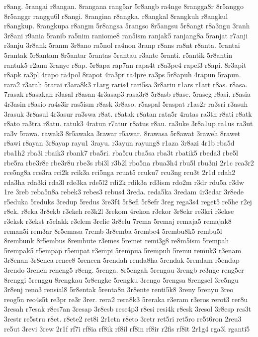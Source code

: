 {r8ang. 5rangai r8angan. 8rangana rang5ar 5r8angb ra4nge 8rangga8r 8r5anggo
8r5anggr ranggu6l r8angi. 8rangina r8angka. r8angkal 8rangkuh r8angkul
r8angkup. 8rangkupa r8angm 5r8angsa 5rangso 8r5angsu 5r8angt r8a3ngu 3ranh
3r8ani r9ania 5ranib ra5nim raniome8 ran5ism ranjak5 ranjang8a 5ranjat
r7anji r3anju 3r8ank 5ranm 3r8ano ra5nol ra4non 3ranp r8ans ra8nt r8anta.
5rantai 5rantak 5r8antam 8r5antar 5rantas 5rantau r3ante 5ranti. r5antik
5r8antin rantuk5 r2anu 3ranye r8ap. 5r8apa rap7an rapa4t r8a3pe4 rapel3
r8api. 8r3apit r8apk ra3pl 4rapo ra4pol 8rapot 4ra3pr ra4pre ra3ps 5r8apuh
4rapun 5rapun. rara2 r3arah 5rarai r3ara8k3 r1arg raris4 rari5sa 3r8ariu
r1ars r1art r8as. r8asa. 7rasak r8asakan r3asal r8asan 4r3asap3 rasa3r8
5r8asb r8ase. 5raseg r8asi. r8asia 4r3asin r8asio ra4s3ir ras5ism r8ask
3r8aso. r5aspal 5raspat r1as2r ra3sri r3asuh 3rasuk 3r8asul 4r3asur ra3swa
r8at. r8atak r8atan rata5r 4ratas ra3th r8ati r8atk r8ato ra3tra r8atu.
ratuk3 4ratun r7atur r8atus r8au. ra3uke 3r8a1up ra1us ra3ut ra3v 5rawa.
rawak3 8r5awaka 3rawar r5awar. 8rawasa 5r8awat 3raweh 8rawet r8awi r8ayan
3r8ayap rayu1 3rayu. r3ayun rayung8 r1aza 3r8azi 4r1b rba5d rba1h2 rba3i
rbaik3 rbank7 rba5ri. rba5ru rba5sa rba3t rbatik5 rbeda3 rbe5l rbe5ra
rbe3r8e rbe3r8u rbe3s rbi3l r3b2l rbo5na rbua3h4 rbu5l rbu3ni 2r1c rca3r2
rce5ng8a rce3ra rci2k rcik3a rci5nga rcuat5 rcuku7 rcu3ng rcu3t 2r1d rdah2
rda3ha rda3ki rda3l rde3ka rde5l2 rdi2k rdik3a rd3ism rdo2m r3dr rdu5a
r3dw 1re 3reb reba5n8a rebek3 rebes3 rebus4 3reda. reda5ka 3redam 4r3edar
3r8ede r5eduka 5reduks 3redup 5redus 3re3f4 5r8efl 5r8efr 3reg rega3s4
reget5 re5he r2ej r8ek. r8eka 3r8ekb r3ekeh re3k2l 3rekom 4rekon r3ekor
3r8ekr re3kri r3ekse r3eksk r3ekst r5elakk r3elem 3relie 3r8elu 7rema
5remaj remaja5 remajak8 reman5i rem3ar 8r5emasa 7remb 3r8emba 5rembe4
5rembu8k5 rembu5l 8rembunk 8r5embus 8rembute r3emes 5remet remi3g8
re8m5ism 5rempah 5rempak5 r5empap r5empat r3empi 5rempua 5rempuh 5remu
remuk3 r3enam 3r8enan 3r8enca rence8 5rencen 5rendah renda8ha 5rendak
5rendam r5endap 3rendo 3renen reneng5 r8eng. 5renga. 8r5engah 5rengau
3rengb re3nge reng5er 8renggi 5renggu 8rengkau 5r8engke 5rengku 3rengo
5rengsa 8rengsel 3re5ngu 3r8enj reno3 rensial8 5r8entak 5renta8n 3r8ente
renti5k8 3reny 5renyu 3reo reog5n reo4s5t re3pr re3r 3rer. rera2 rera8k3
5reraka r3eram r3eros rerot3 rer8u 3resah r7esak r8es7an 3resap 3r8esb
rese4p3 r8esi resi4k r8esk 3resol 3r8esp res3t 3restr re5stru r8et. r8ete2
ret8i 2r1etn r8eto 3retr ret5ri ret5ro re5t6ron 2reu3 re5ut 3revi 3rew
2r1f rf7i rf8ia rf8ik rf8il rf8in rf8ir r2fis rf8it 2r1g4 rga3l rganti5
}
